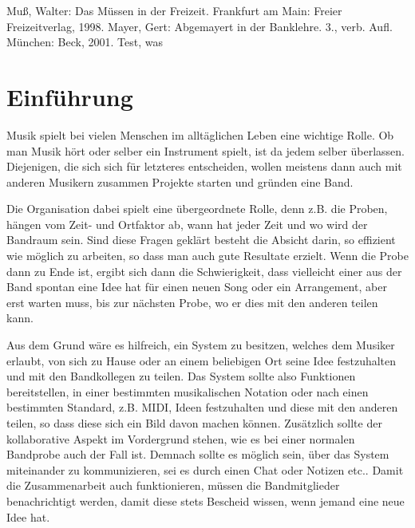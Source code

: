 \documentclass[12pt]{report}
\begin{document}



\tableofcontents

\newpage

\begin{thebibliography}{9999999}

  Muß, Walter: Das Müssen in der
  Freizeit. Frankfurt am Main: Freier Freizeitverlag, 1998.
  Mayer, Gert: Abgemayert in der
  Banklehre. 3., verb. Aufl. München: Beck, 2001.
  Test, was
\end{thebibliography}


\chapter{Einführung}


\cite{Test} Musik spielt bei vielen Menschen im alltäglichen Leben eine wichtige Rolle. Ob man Musik hört oder selber ein Instrument spielt, ist da jedem selber überlassen. Diejenigen, die sich sich für letzteres entscheiden, wollen meistens dann auch mit anderen Musikern zusammen Projekte starten und gründen eine Band.

Die Organisation dabei spielt eine übergeordnete Rolle, denn z.B. die Proben, hängen vom Zeit- und Ortfaktor ab, wann hat jeder Zeit und wo wird der Bandraum sein. Sind diese Fragen geklärt besteht die Absicht darin, so effizient wie möglich zu arbeiten, so dass man auch gute Resultate erzielt. 
Wenn die Probe dann zu Ende ist, ergibt sich dann die Schwierigkeit, dass vielleicht einer aus der Band spontan eine Idee hat für einen neuen Song oder ein Arrangement, aber erst warten muss, bis zur nächsten Probe, wo er dies mit den anderen teilen kann.

Aus dem Grund wäre es hilfreich, ein System zu besitzen, welches dem Musiker erlaubt, von sich zu Hause oder an einem beliebigen Ort seine Idee festzuhalten und mit den Bandkollegen zu teilen. Das System sollte also Funktionen bereitstellen, in einer bestimmten musikalischen Notation oder nach einen bestimmten Standard, z.B. MIDI, Ideen festzuhalten und diese mit den anderen teilen, so dass diese sich ein Bild davon machen können. Zusätzlich sollte der kollaborative Aspekt im Vordergrund stehen, wie es bei einer normalen Bandprobe auch der Fall ist. Demnach sollte es möglich sein, über das System miteinander zu kommunizieren, sei es durch einen Chat oder Notizen etc.. Damit die Zusammenarbeit auch funktionieren, müssen die Bandmitglieder benachrichtigt werden, damit diese stets Bescheid wissen, wenn jemand eine neue Idee hat.
\end{document}

